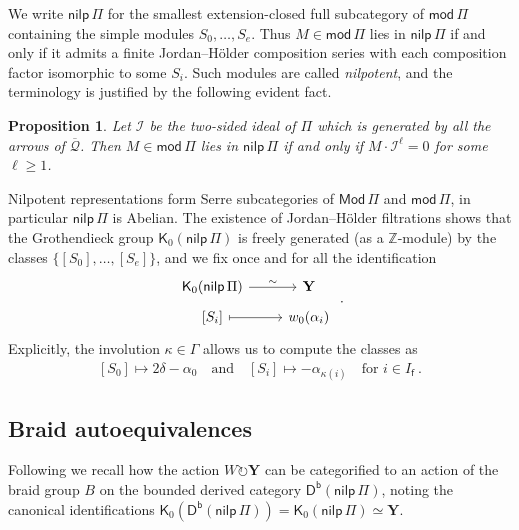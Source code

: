 \documentclass[reqno,a4paper]{amsart}
\newcommand{\calI}{\mathcal{I}}
\newcommand{\Z}{\mathbb{Z}}
\newcommand{\sfK}{\mathsf{K}}
\newcommand{\sff}{\mathsf{f}}
\newcommand{\bfY}{\mathbf{Y}}
\newcommand{\catMod}{\mathsf{Mod}}
\newcommand{\catmod}{\mathsf{mod}}
\newcommand{\modPi}{\catmod\, \Pi}
\newcommand{\ModPi}{\catMod\, \Pi}
\newcommand{\nilpPi}{\mathsf{nilp}\, \Pi}
\newcommand{\catDb}{\mathsf{D}^\mathsf{b}}
\newcommand{\qv}{\mathcal{Q}}
\newcommand{\doubleqv}{\overline{\qv}}
\newcommand{\rootlattice}{\bfY}
\theoremstyle{basic-theorem}
\newtheorem{proposition}[theorem]{Proposition}
\numberwithin{equation}{section}
\begin{document}
We write $\nilpPi$ for the smallest extension-closed full subcategory of $\modPi$ containing the simple modules $S_0,\ldots,S_e$. Thus $M\in \modPi$ lies in $\nilpPi$ if and only if it admits a finite Jordan--H\"older composition series with each composition factor isomorphic to some $S_i$. Such modules are called \textit{nilpotent}, and the terminology is justified by the following evident fact.
\begin{proposition}
    Let $\calI$ be the two-sided ideal of $\Pi$ which is generated by all the arrows of $\doubleqv$. Then $M\in \modPi$ lies in $\nilpPi$ if and only if $M\cdot \calI^\ell = 0$ for some $\ell \geq 1$.
\end{proposition}
Nilpotent representations form Serre subcategories of $\ModPi$ and $\modPi$, in particular $\nilpPi$ is Abelian. The existence of Jordan--H\"older filtrations shows that the Grothendieck group $\sfK_0(\nilpPi)$ is freely generated (as a $\Z$-module) by the classes $\{[S_0],\ldots,[S_e]\}$, and we fix once and for all the identification
\begin{align}\label{eq:K0rootidentification}
	\begin{tikzcd}[ampersand replacement=\&, row sep=tiny]
		\sfK_0(\nilpPi) \ar{r}{\sim} \&\rootlattice\\
		{[S_i]} \ar[mapsto]{r}\& w_0(\alpha_{i})
    \end{tikzcd}\ .
\end{align}
Explicitly, the involution $\kappa\in \Gamma$ allows us to compute the classes as
\begin{align}\label{eq:simpleclasses}
    [S_0]\mapsto 2\delta-\alpha_0\quad \text{and} \quad [S_i]\mapsto -\alpha_{\kappa(i)} \quad \text{for } i\in I_\sff\ .
\end{align}

\subsection{Braid autoequivalences}\label{subsec:reflection-functors}

Following \cite{BIRS09,SY13} we recall how the action $W\circlearrowright \rootlattice$ can be categorified to an action of the braid group $B$ on the bounded derived category $\catDb(\nilpPi)$, noting the canonical identifications $\sfK_0(\catDb(\nilpPi))=\sfK_0(\nilpPi)\simeq \rootlattice$.
\end{document}
